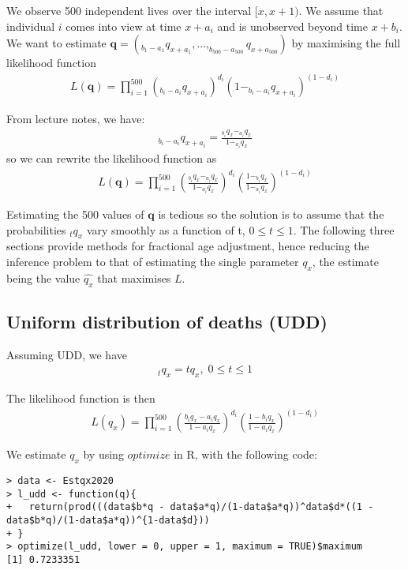 \documentclass[a4paper,11pt]{article}
\theoremstyle{mytheor}
\begin{document}
We observe 500 independent lives over the interval $[x,x+1)$. We assume that individual $i$ comes into view at time $x+a_i$ and is unobserved beyond time $x+b_i$. We want to estimate $\textbf{q} = (_{b_1-a_1}q_{x+a_1}, ... ,_{b_{500}-a_{500}}q_{x+a_{500}})$ by maximising the full likelihood function 
\begin{align*}
    L(\textbf{q}) = \prod_{i = 1}^{500}(_{b_i-a_i}q_{x+a_i})^{d_i}(1-_{b_i-a_i}q_{x+a_i})^{(1-d_i)}
\end{align*}

From lecture notes, we have:
\begin{align*}
   _{b_i-a_i}q_{x+a_i} = \frac{_{b_i}q_x - _{a_i}q_x}{1 - _{a_i}q_x}
\end{align*}
so we can rewrite the likelihood function as
\begin{align*}
    L(\textbf{q}) = \prod_{i = 1}^{500}\left(\frac{_{b_i}q_x - _{a_i}q_x}{1 - _{a_i}q_x}\right)^{d_i}\left(\frac{1 - _{b_i}q_x}{1 - _{a_i}q_x}\right)^{(1-d_i)}
\end{align*}

Estimating the 500 values of $\textbf{q}$ is tedious so the solution is to assume that the probabilities $_tq_x$ vary smoothly as a function of t, $0\leq t \leq 1$. The following three sections provide methods for fractional age adjustment, hence reducing the inference problem to that of estimating the single parameter $q_x$, the estimate being the value $\hat{q_x}$ that maximises $L$.

\subsection*{Uniform distribution of deaths (UDD)}

Assuming UDD, we have 
\begin{align*}
    _tq_x = tq_x, \; 0 \leq t \leq 1
\end{align*}

The likelihood function is then
\begin{align*}
    L(q_x) = \prod_{i = 1}^{500}\left(\frac{b_iq_x - a_iq_x}{1 - a_iq_x}\right)^{d_i}\left(\frac{1 - b_iq_x}{1 - a_iq_x}\right)^{(1-d_i)}
\end{align*}

We estimate $q_x$ by using $optimize$ in R, with the following code:
\begin{lstlisting}[label={list:first},caption=Code to estimate $q_x$ under the UDD assumption]
> data <- Estqx2020
> l_udd <- function(q){
+   return(prod(((data$b*q - data$a*q)/(1-data$a*q))^data$d*((1 - data$b*q)/(1-data$a*q))^{1-data$d}))
+ }
> optimize(l_udd, lower = 0, upper = 1, maximum = TRUE)$maximum
[1] 0.7233351
\end{lstlisting}
\end{document}
